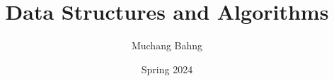 \documentclass{article}
\begin{document}
\title{Data Structures and Algorithms}
\author{Muchang Bahng}
\date{Spring 2024}

\maketitle
\tableofcontents
\pagebreak














\end{document}
